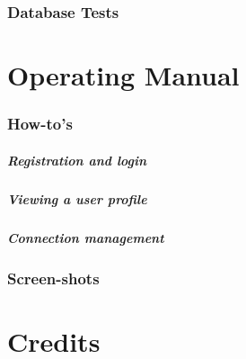 \documentclass[12pt]{report}
\begin{document}
\subsection{Database Tests}


\chapter{Operating Manual}
\subsection{How-to's}
\paragraph{Registration and login}
\paragraph{Viewing a user profile}
\paragraph{Connection management}

\subsection{Screen-shots}

\chapter{Credits}
\end{document}
